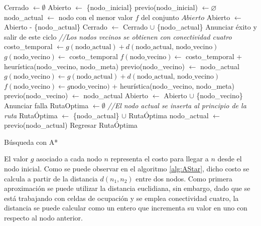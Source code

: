 \documentclass[letterpaper,12pt]{article}
\begin{document}
\begin{algorithm}
\DontPrintSemicolon
{}
Cerrado $\leftarrow \emptyset$\;
Abierto $\leftarrow$ \{nodo\_inicial\}\;
previo(nodo\_inicial) $\leftarrow \varnothing$\;
{
  nodo\_actual $\leftarrow$ nodo con el menor valor $f$ del conjunto $Abierto$\;
  Abierto $\leftarrow$ Abierto - \{nodo\_actual\}\;
  Cerrado $\leftarrow$ Cerrado $\cup$ \{nodo\_actual\}\;
  {
    Anunciar éxito y salir de este ciclo\;
  }
  {
    \textit{//Los nodos vecinos se obtienen con conectividad cuatro}\;
    {
      costo\_temporal $\leftarrow g(\textrm{nodo\_actual}) + d(\textrm{nodo\_actual, nodo\_vecino})$\;
      {
        $g(\textrm{nodo\_vecino})\leftarrow$ costo\_temporal\;
        $f(\textrm{nodo\_vecino})\leftarrow$ costo\_temporal + heurística(nodo\_vecino, nodo\_meta)\;
        previo(nodo\_vecino) $\leftarrow$ nodo\_actual\;
      }
    }
    {
      $g(\textrm{nodo\_vecino})\leftarrow g(\textrm{nodo\_actual}) + d(\textrm{nodo\_actual, nodo\_vecino})$\;
      $f(\textrm{nodo\_vecino})\leftarrow g\textrm{nodo\_vecino})$  + heurística(nodo\_vecino, nodo\_meta)\;
      previo(nodo\_vecino) $\leftarrow$ nodo\_actual\;
      Abierto $\leftarrow$ Abierto $\cup$ \{nodo\_vecino\}\; 
    }
  }
}
{
  Anunciar falla\;
}
{
  RutaOptima $\leftarrow\emptyset$ \;
  {
    \textit{//El nodo actual se inserta al principio de la ruta}\;
    RutaÓptima $\leftarrow$ \{nodo\_actual\} $\cup$ RutaÓptima \;
    nodo\_actual $\leftarrow$ previo(nodo\_actual)\;
  }
  Regresar RutaÓptima
}
\caption{Búsqueda con A*}
\label{alg:AStar}
\end{algorithm}

El valor $g$ asociado a cada nodo $n$ representa el costo para llegar a $n$ desde el nodo inicial. Como se puede observar en el algoritmo \ref{alg:AStar}, dicho costo se calcula a partir de la distancia $d(n_1,n_2)$ entre dos nodos. Como primera aproximación se puede utilizar la distancia euclidiana, sin embargo, dado que se está trabajando con celdas de ocupación y se emplea conectividad cuatro, la distancia se puede calcular como un entero que incrementa su valor en uno con respecto al nodo anterior.
\end{document}
